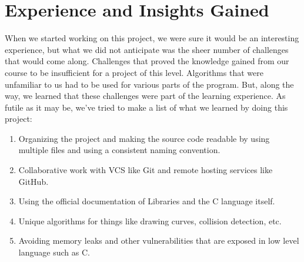 \documentclass[report.tex]{subfiles}
\begin{document}
    \section*{Experience and Insights Gained}
	When we started working on this project, we were sure it would be an interesting experience, but what we did not anticipate was the sheer number of challenges that would come along. Challenges that proved the knowledge gained from our course to be insufficient for a project of this level. Algorithms that were unfamiliar to us had to be used for various parts of the program. But, along the way, we learned that these challenges were part of the learning experience.
As futile as it may be, we've tried to make a list of what we learned by doing this project:
    \begin{enumerate}
        \item{Organizing the project and making the source code readable by using multiple files and using a consistent naming convention.}
        \item{Collaborative work with VCS like Git and remote hosting services like GitHub.}
        \item{Using the official documentation of Libraries and the C language itself.}
        \item{Unique algorithms for things like drawing curves, collision detection, etc.}
        \item{Avoiding memory leaks and other vulnerabilities that are exposed in low level language such as C.}
    \end{enumerate}
\end{document}
